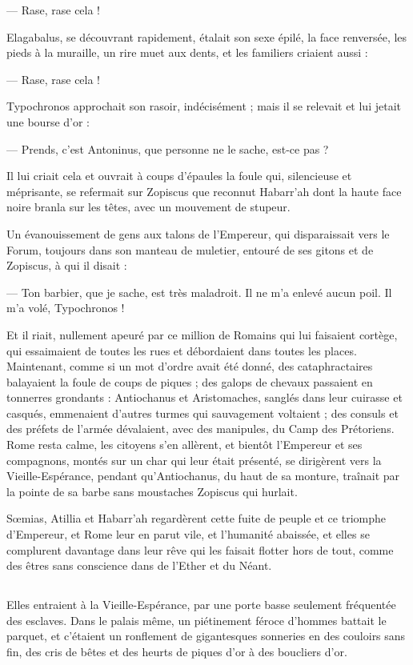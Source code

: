 \documentclass[a4paper, 11pt, oneside, polutonikogreek, french]{article}
\begin{document}
--- Rase, rase cela !

Elagabalus, se découvrant rapidement, étalait son sexe épilé, la face renversée, les pieds à la muraille, un rire muet aux dents, et les familiers criaient aussi :

--- Rase, rase cela !

Typochronos approchait son rasoir, indécisément ; mais il se relevait et lui jetait une bourse d'or :

--- Prends, c'est Antoninus, que personne ne le sache, est-ce pas ?

Il lui criait cela et ouvrait à coups d'épaules la foule qui, silencieuse et méprisante, se refermait sur Zopiscus que reconnut Habarr'ah dont la haute face noire branla sur les têtes, avec un mouvement de stupeur.

Un évanouissement de gens aux talons de l'Empereur, qui disparaissait vers le Forum, toujours dans son manteau de muletier, entouré de ses gitons et de Zopiscus, à qui il disait :

--- Ton barbier, que je sache, est très maladroit. Il ne m'a enlevé aucun poil. Il m'a volé, Typochronos !

Et il riait, nullement apeuré par ce million de Romains qui lui faisaient cortège, qui essaimaient de toutes les rues et débordaient dans toutes les places. Maintenant, comme si un mot d'ordre avait été donné, des cataphractaires balayaient la foule de coups de piques ; des galops de chevaux passaient en tonnerres grondants : Antiochanus et Aristomaches, sanglés dans leur cuirasse et casqués, emmenaient d'autres turmes qui sauvagement voltaient ; des consuls et des préfets de l'armée dévalaient, avec des manipules, du Camp des Prétoriens. Rome resta calme, les citoyens s'en allèrent, et bientôt l'Empereur et ses compagnons, montés sur un char qui leur était présenté, se dirigèrent vers la Vieille-Espérance, pendant qu'Antiochanus, du haut de sa monture, traînait par la pointe de sa barbe sans moustaches Zopiscus qui hurlait.

Sœmias, Atillia et Habarr'ah regardèrent cette fuite de peuple et ce triomphe d'Empereur, et Rome leur en parut vile, et l'humanité abaissée, et elles se complurent davantage dans leur rêve qui les faisait flotter hors de tout, comme des êtres sans conscience dans de l'Ether et du Néant.
\clearpage
\subsection{}
\paragraph{}
Elles entraient à la Vieille-Espérance, par une porte basse seulement fréquentée des esclaves. Dans le palais même, un piétinement féroce d'hommes battait le parquet, et c'étaient un ronflement de gigantesques sonneries en des couloirs sans fin, des cris de bêtes et des heurts de piques d'or à des boucliers d'or.
\end{document}

